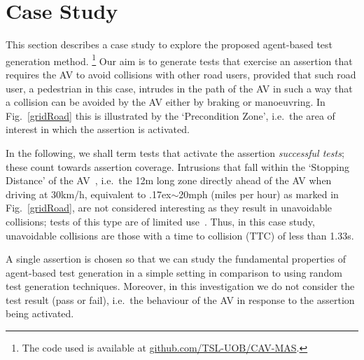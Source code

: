 \documentclass[letterpaper, 10 pt, journal, twoside]{IEEEtran}
\begin{document}
\section{Case Study} \label{s:case-study}
 
This section describes a case study to explore the proposed agent-based test generation method.%
\footnote{The code used is available at \url{github.com/TSL-UOB/CAV-MAS}.} %
%
Our aim is to generate tests that exercise an assertion that requires the AV to avoid collisions with other road users, provided that such road user, a pedestrian in this case, intrudes in the path of the AV in such a way that a collision can be avoided by the AV either by braking or manoeuvring. In Fig.~\ref{gridRoad} this is illustrated by the `Precondition Zone', i.e.\ the area of interest in which the assertion is activated.

In the following, we shall term tests that activate the assertion \textit{successful tests}; these count towards assertion coverage. 
%
Intrusions that fall within the `Stopping Distance' of the AV~\cite{codes2015highway}, i.e.\ the 12m long zone 
directly ahead of the AV when driving at 30km/h, equivalent to {\raise.17ex\hbox{$\scriptstyle\sim$}}20mph (miles per hour) as marked in Fig.~\ref{gridRoad}, are not considered interesting as they result in unavoidable collisions; tests of this type are of limited use~\cite{Tuncali2018}. 
%
Thus, in this case study, unavoidable collisions are those with a time to collision (TTC) of less than 1.33s. %
%

A single assertion is chosen so that we can study the fundamental properties of agent-based test generation in a simple setting in comparison to using random test generation techniques.
%
Moreover, in this investigation we do not consider the test result (pass or fail), i.e.\ the behaviour of the AV in response to the assertion being activated. 


\end{document}
